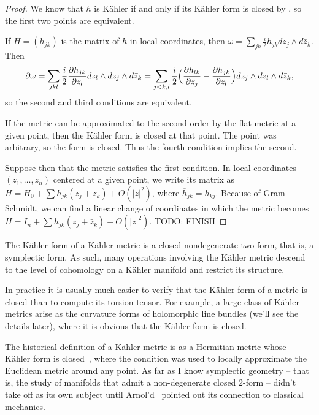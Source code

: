 \documentclass[11pt]{article}
\newtheorem*{proof}{Proof}
\begin{document}
\begin{proof}
We know that $h$ is K\"ahler if and only if its K\"ahler form is closed by , so the first two points are equivalent.

If $H = (h_{jk})$ is the matrix of $h$ in local coordinates, then $\omega = \sum_{jk} \frac i2 h_{jk} dz_j \wedge d\bar z_k$. Then
\[
\partial\omega
= \sum_{jkl} \frac i2 \frac{\partial h_{jk}}{\partial z_l} dz_l \wedge dz_j \wedge d\bar z_k
= \sum_{j<k,l} \frac i2
\Bigl(
\frac{\partial h_{lk}}{\partial z_j}
- \frac{\partial h_{jk}}{\partial z_l}
\Bigr)
dz_j \wedge dz_l \wedge d\bar z_k,
\]
so the second and third conditions are equivalent.

If the metric can be approximated to the second order by the flat metric at a given point, then the K\"ahler form is closed at that point. The point was arbitrary, so the form is closed. Thus the fourth condition implies the second.

Suppose then that the metric satisfies the first condition. In local coordinates $(z_1,\ldots,z_n)$ centered at a given point, we write its matrix as $H = H_0 + \sum h_{jk}(z_j + \bar z_k) + O(|z|^2)$, where $\overline h_{jk} = h_{kj}$. Because of Gram--Schmidt, we can find a linear change of coordinates in which the metric becomes $H = I_n + \sum h_{jk}(z_j + \bar z_k) + O(|z|^2)$.
TODO: FINISH
\end{proof}

The K\"ahler form of a K\"ahler metric is a closed nondegenerate two-form, that is, a symplectic form. As such, many operations involving the K\"ahler metric descend to the level of cohomology on a K\"ahler manifold and restrict its structure.

In practice it is usually much easier to verify that the K\"ahler form of a metric is closed than to compute its torsion tensor. For example, a large class of K\"ahler metrics arise as the curvature forms of holomorphic line bundles (we'll see the details later), where it is obvious that the K\"ahler form is closed.

The historical definition of a K\"ahler metric is as a Hermitian metric whose K\"ahler form is closed~\cite{kahler}, where the condition was used to locally approximate the Euclidean metric around any point. As far as I know symplectic geometry -- that is, the study of manifolds that admit a non-degenerate closed $2$-form -- didn't take off as its own subject until Arnol'd~\cite{arnold} pointed out its connection to classical mechanics.
\end{document}
